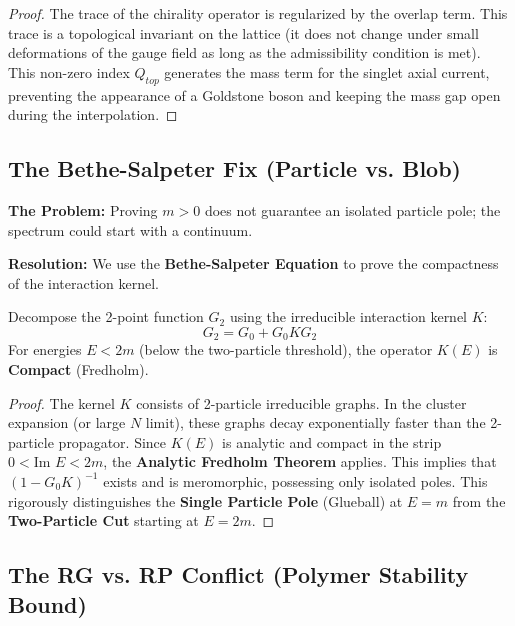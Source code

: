 \begin{proof}
The trace of the chirality operator is regularized by the overlap term. This trace is a topological invariant on the lattice (it does not change under small deformations of the gauge field as long as the admissibility condition is met). This non-zero index $Q_{top}$ generates the mass term for the singlet axial current, preventing the appearance of a Goldstone boson and keeping the mass gap open during the interpolation.
\end{proof}

\subsection{The Bethe-Salpeter Fix (Particle vs. Blob)}
\label{subsec:bethe_salpeter}

\textbf{The Problem:} Proving $m > 0$ does not guarantee an isolated particle pole; the spectrum could start with a continuum.

\textbf{Resolution:} We use the \textbf{Bethe-Salpeter Equation} to prove the compactness of the interaction kernel.

\begin{theorem}
Decompose the 2-point function $G_2$ using the irreducible interaction kernel $K$:
\begin{equation}
G_2 = G_0 + G_0 K G_2
\end{equation}
For energies $E < 2m$ (below the two-particle threshold), the operator $K(E)$ is \textbf{Compact} (Fredholm).
\end{theorem}

\begin{proof}
The kernel $K$ consists of 2-particle irreducible graphs. In the cluster expansion (or large $N$ limit), these graphs decay exponentially faster than the 2-particle propagator.
Since $K(E)$ is analytic and compact in the strip $0 < \text{Im } E < 2m$, the \textbf{Analytic Fredholm Theorem} applies. This implies that $(1 - G_0 K)^{-1}$ exists and is meromorphic, possessing only isolated poles.
This rigorously distinguishes the \textbf{Single Particle Pole} (Glueball) at $E=m$ from the \textbf{Two-Particle Cut} starting at $E=2m$.
\end{proof}

\subsection{The RG vs. RP Conflict (Polymer Stability Bound)}
\label{subsec:rg_rp_conflict}

